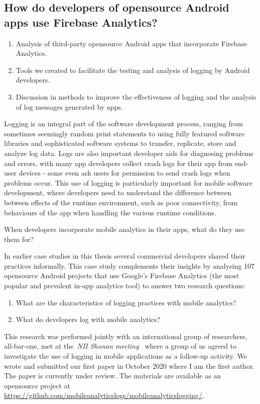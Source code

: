 \subsection{How do developers of opensource Android apps use Firebase Analytics?}
\begin{enumerate}
    \item Analysis of third-party opensource Android apps that incorporate Firebase Analytics.
    \item Tools we created to facilitate the testing and analysis of logging by Android developers.
    \item Discussion in methods to improve the effectiveness of logging and the analysis of log messages generated by apps.
\end{enumerate}

Logging is an integral part of the software development process, ranging from sometimes seemingly random print statements to using fully featured software libraries and sophisticated software systems to transfer, replicate, store and analyze log data. Logs are also important developer aids for diagnosing problems and errors, with many app developers collect crash logs for their app from end-user devices - some even ask users for permission to send crash logs when problems occur.  This use of logging is particularly important for mobile software development, where developers need to understand the difference between between effects of the runtime environment, such as poor connectivity, from behaviours of the app when handling the various runtime conditions.

When developers incorporate mobile analytics in their apps, what do they use them for? 

In earlier case studies in this thesis several commercial developers shared their practices informally. This case study complements their insights by analysing 107 opensource Android projects that use Google's Firebase Analytics (the most popular and prevalent in-app analytics tool) to answer two research questions:
\begin{enumerate}
    \item What are the characteristics of logging practices with mobile analytics?
    \item What do developers log with mobile analytics?
\end{enumerate}

This research was performed jointly with an international group of researchers, all-bar-one, met at the~\textit{NII Shonan meeting~\citep{nii_shonan_workshop_152}} where a group of us agreed to investigate the use of logging in mobile applications as a follow-up activity. We wrote and submitted our first paper in October 2020 where I am the first author. The paper is currently under review. The materials are available as an opensource project at \url{https://github.com/mobileanalyticslogs/mobileanalyticslogging/}.



